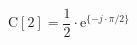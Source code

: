 \correct
\begin{center}
\[
\textrm{C}[2] = \frac{1}{2} \cdot \textrm{e}^{\{ -j \cdot \pi/2 \}}
\]
\end{center}
